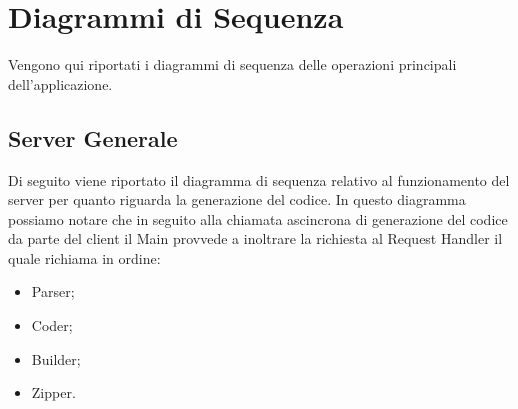 \documentclass[../DefinizioneDiProdotto.tex]{subfiles}
\begin{document}
\section{Diagrammi di Sequenza}
Vengono qui riportati i diagrammi di sequenza delle operazioni principali dell’applicazione.
\subsection{Server Generale}
Di seguito viene riportato il diagramma di sequenza relativo al funzionamento del server per quanto riguarda la generazione del codice.
In questo diagramma possiamo notare che in seguito alla chiamata ascincrona di generazione del codice da parte del client il Main  provvede a inoltrare la richiesta al Request Handler il quale richiama
in ordine:
\begin{itemize}
	\item Parser;
	\item Coder;
	\item Builder;
	\item Zipper.
\end{itemize} 
\end{document}
